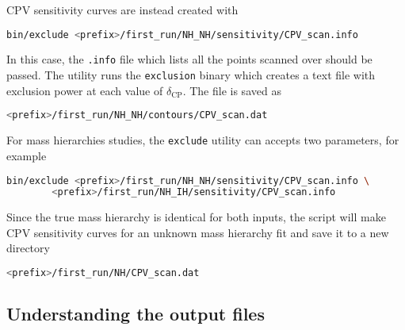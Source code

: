 \documentclass[a4paper, 11pt]{article}
\begin{document}
CPV sensitivity curves are instead created with
\begin{lstlisting}[language=bash]
    bin/exclude <prefix>/first_run/NH_NH/sensitivity/CPV_scan.info
\end{lstlisting}
In this case, the \texttt{.info} file which lists all the points scanned over should be passed.
The utility runs the \texttt{exclusion} binary which creates a text file with exclusion power %
at each value of $\delta_\text{CP}$.
The file is saved as
\begin{lstlisting}[language=bash]
    <prefix>/first_run/NH_NH/contours/CPV_scan.dat
\end{lstlisting}
    
For mass hierarchies studies, the \texttt{exclude} utility can accepts two parameters, for example
\begin{lstlisting}[language=bash]
    bin/exclude <prefix>/first_run/NH_NH/sensitivity/CPV_scan.info \
		<prefix>/first_run/NH_IH/sensitivity/CPV_scan.info
\end{lstlisting}
Since the true mass hierarchy is identical for both inputs, the script will make CPV sensitivity curves %
for an unknown mass hierarchy fit and save it to a new directory
\begin{lstlisting}[language=bash]
    <prefix>/first_run/NH/CPV_scan.dat
\end{lstlisting}

\subsection{Understanding the output files}
\end{document}
